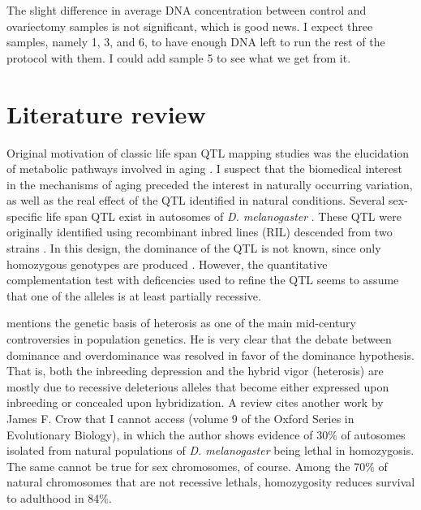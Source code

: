 \documentclass[a4paper,12pt]{article}
\begin{document}
The slight difference in average DNA concentration between control and ovariectomy samples is not significant, which is good news. I expect three samples, namely 1, 3, and 6, to have enough DNA left to run the rest of the protocol with them. I could add sample 5 to see what we get from it.

\section{Literature review}
Original motivation of classic life span QTL mapping studies was the elucidation of metabolic pathways involved in aging \citep{Nuzhdin2005}. I suspect that the biomedical interest in the mechanisms of aging preceded the interest in naturally occurring variation, as well as the real effect of the QTL identified in natural conditions. Several sex-specific life span QTL exist in autosomes of \emph{D. melanogaster} \citep{Nuzhdin1997,Pasyukova2000}. These QTL were originally identified using recombinant inbred lines (RIL) descended from two strains \citep{Nuzhdin1997}. In this design, the dominance of the QTL is not known, since only homozygous genotypes are produced \citep[][page 432]{Lynch1998}. However, the quantitative complementation test with deficencies used to refine the QTL \citep{Pasyukova2000} seems to assume that one of the alleles is at least partially recessive.

\citet{Crow2008} mentions the genetic basis of heterosis as one of the main mid-century controversies in population genetics. He is very clear that the debate between dominance and overdominance was resolved in favor of the dominance hypothesis. That is, both the inbreeding depression and the hybrid vigor (heterosis) are mostly due to recessive deleterious alleles that become either expressed upon inbreeding or concealed upon hybridization. A review \citep{Charlesworth2009} cites another work by James F. Crow that I cannot access (volume 9 of the Oxford Series in Evolutionary Biology), in which the author shows evidence of 30\% of autosomes isolated from natural populations of \emph{D. melanogaster} being lethal in homozygosis. The same cannot be true for sex chromosomes, of course. Among the 70\% of natural chromosomes that are not recessive lethals, homozygosity reduces survival to adulthood in 84\%.
\end{document}
